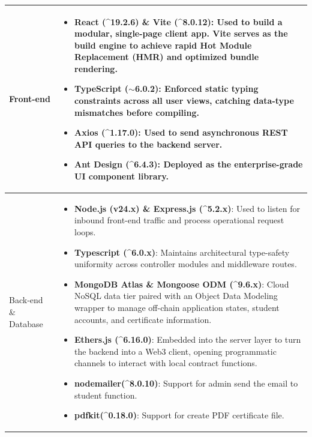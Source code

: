 \begin{longtable}{|m{3.5cm}|m{10.5cm}|}
    \hline
    Front-end
    & \begin{itemize}
        \item \textbf{React (\^{}19.2.6) \& Vite (\^{}8.0.12)}: Used to build a modular, single-page client app. Vite serves as the build engine to achieve rapid Hot Module Replacement (HMR) and optimized bundle rendering.

        \item \textbf{TypeScript ($\sim$6.0.2)}: Enforced static typing constraints across all user views, catching data-type mismatches before compiling.

        \item \textbf{Axios (\^{}1.17.0)}: Used to send asynchronous REST API queries to the backend server.

        \item \textbf{Ant Design (\^{}6.4.3)}: Deployed as the enterprise-grade UI component library.
    \end{itemize}\\
    \hline

    Back-end \& Database
    & \begin{itemize}
        \item \textbf{Node.js (v24.x) \& Express.js (\^{}5.2.x)}: Used to listen for inbound front-end traffic and process operational request loops.
        
        \item \textbf{Typescript (\^{}6.0.x)}: Maintains architectural type-safety uniformity across controller modules and middleware routes.
        
        \item \textbf{MongoDB Atlas \& Mongoose ODM (\^{}9.6.x)}: Cloud NoSQL data tier paired with an Object Data Modeling wrapper to manage off-chain application states, student accounts, and certificate information.
        
        \item \textbf{Ethers.js (\^{}6.16.0)}: Embedded into the server layer to turn the backend into a Web3 client, opening programmatic channels to interact with local contract functions.

        \item \textbf{nodemailer(\^{}8.0.10)}: Support for admin send the email to student function.

        \item \textbf{pdfkit(\^{}0.18.0)}: Support for create PDF certificate file.


\end{itemize}
\end{longtable}

